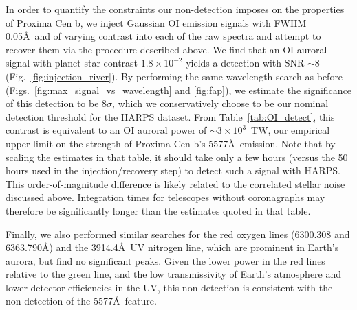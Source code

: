 \documentclass{emulateapj}
\begin{document}
In order to quantify the constraints our non-detection imposes on the properties of Proxima Cen b, we inject Gaussian OI emission signals with FWHM 0.05\AA\ and of varying contrast into each of the raw spectra and attempt to recover them via the procedure described above. We find that an OI auroral signal with planet-star contrast $1.8\times 10^{-2}$ yields a detection with SNR ${\sim} 8$ (Fig.~\ref{fig:injection_river}). By performing the same wavelength search as before (Figs.~\ref{fig:max_signal_vs_wavelength} and \ref{fig:fap}), we estimate the significance of this detection to be $8\sigma$, which we conservatively choose to be our nominal detection threshold for the HARPS dataset. From Table~\ref{tab:OI_detect}, this contrast is equivalent to an OI auroral power of ${\sim} 3\times 10^{3}$~TW, our empirical upper limit on the strength of Proxima Cen b's 5577\AA\ emission. Note that by scaling the estimates in that table, it should take only a few hours (versus the 50 hours used in the injection/recovery step) to detect such a signal with HARPS. This order-of-magnitude difference is likely related to the correlated stellar noise discussed above. Integration times for telescopes without coronagraphs may therefore be significantly longer than the estimates quoted in that table.

Finally, we also performed similar searches for the red oxygen lines (6300.308 and 6363.790\AA) and the 3914.4\AA\ UV nitrogen line, which are prominent in Earth's aurora, but find no significant peaks. Given the lower power in the red lines relative to the green line, and the low transmissivity of Earth's atmosphere and lower detector efficiencies in the UV, this non-detection is consistent with the non-detection of the 5577\AA\ feature.
  
\end{document}
